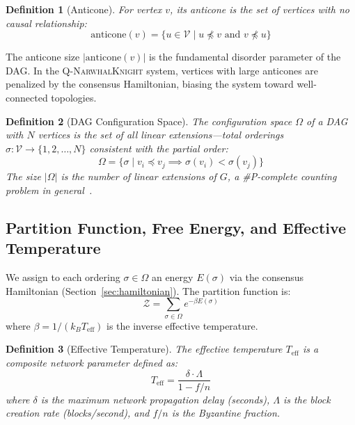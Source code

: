 \documentclass[12pt,a4paper,twocolumn]{article}
\newtheorem{definition}{Definition}
\newcommand{\qnk}{\textsc{Q-NarwhalKnight}}
\newcommand{\Zpart}{\mathcal{Z}}
\newcommand{\vertexset}{\mathcal{V}}
\newcommand{\Teff}{T_{\mathrm{eff}}}
\begin{document}
\begin{definition}[Anticone]
For vertex $v$, its \emph{anticone} is the set of vertices with no causal relationship:
\begin{equation}
\mathrm{anticone}(v) = \{u \in \vertexset \mid u \not\preceq v \text{ and } v \not\preceq u\}
\end{equation}
\end{definition}

The anticone size $|\mathrm{anticone}(v)|$ is the fundamental disorder parameter of the DAG. In the \qnk{} system, vertices with large anticones are penalized by the consensus Hamiltonian, biasing the system toward well-connected topologies.

\begin{definition}[DAG Configuration Space]
The configuration space $\Omega$ of a DAG with $N$ vertices is the set of all \emph{linear extensions}---total orderings $\sigma: \vertexset \to \{1, 2, \ldots, N\}$ consistent with the partial order:
\begin{equation}
\Omega = \{\sigma \mid v_i \preceq v_j \implies \sigma(v_i) < \sigma(v_j)\}
\end{equation}
The size $|\Omega|$ is the number of linear extensions of $G$, a \#P-complete counting problem in general~\cite{brightwell}.
\end{definition}

\subsection{Partition Function, Free Energy, and Effective Temperature}

We assign to each ordering $\sigma \in \Omega$ an energy $E(\sigma)$ via the consensus Hamiltonian (Section~\ref{sec:hamiltonian}). The partition function is:
\begin{equation}
\Zpart = \sum_{\sigma \in \Omega} e^{-\beta E(\sigma)}
\end{equation}
where $\beta = 1/(k_B \Teff)$ is the inverse effective temperature.

\begin{definition}[Effective Temperature]
\label{def:teff}
The effective temperature $\Teff$ is a composite network parameter defined as:
\begin{equation}
\Teff = \frac{\delta \cdot \Lambda}{1 - f/n}
\end{equation}
where $\delta$ is the maximum network propagation delay (seconds), $\Lambda$ is the block creation rate (blocks/second), and $f/n$ is the Byzantine fraction.
\end{definition}
\end{document}
